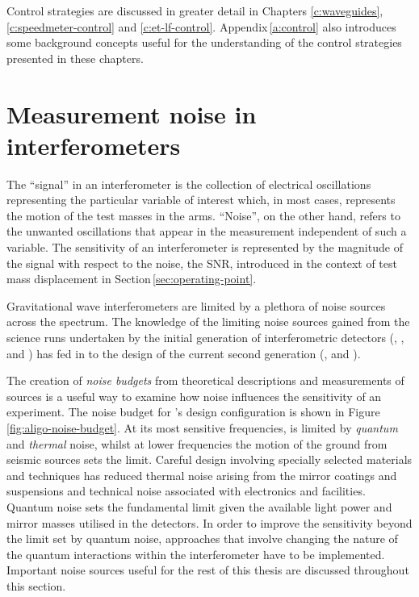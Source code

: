 Control strategies are discussed in greater detail in Chapters \ref{c:waveguides}, \ref{c:speedmeter-control} and \ref{c:et-lf-control}. Appendix\,\ref{a:control} also introduces some background concepts useful for the understanding of the control strategies presented in these chapters.

\section{\label{sec:ifo-noise}Measurement noise in interferometers}
The ``signal'' in an interferometer is the collection of electrical oscillations representing the particular variable of interest which, in most cases, represents the motion of the test masses in the arms. ``Noise'', on the other hand, refers to the unwanted oscillations that appear in the measurement independent of such a variable. The sensitivity of an interferometer is represented by the magnitude of the signal with respect to the noise, the \gls{SNR}, introduced in the context of test mass displacement in Section\,\ref{sec:operating-point}.

Gravitational wave interferometers are limited by a plethora of noise sources across the spectrum. The knowledge of the limiting noise sources gained from the science runs undertaken by the initial generation of interferometric detectors (\LIGO{}, \VIRGO{}, \GEO{} and \TAMA{}) has fed in to the design of the current second generation (\ALIGO{}, \AVIRGO{} and \KAGRA{}).

The creation of \emph{noise budgets} from theoretical descriptions and measurements of sources is a useful way to examine how noise influences the sensitivity of an experiment. The noise budget for \ALIGO{}'s design configuration is shown in Figure\,\ref{fig:aligo-noise-budget}. At its most sensitive frequencies, \ALIGO{} is limited by \emph{quantum} and \emph{thermal} noise, whilst at lower frequencies the motion of the ground from seismic sources sets the limit. Careful design involving specially selected materials and techniques has reduced thermal noise arising from the mirror coatings and suspensions and technical noise associated with electronics and facilities. Quantum noise sets the fundamental limit given the available light power and mirror masses utilised in the detectors. In order to improve the sensitivity beyond the limit set by quantum noise, approaches that involve changing the nature of the quantum interactions within the interferometer have to be implemented. Important noise sources useful for the rest of this thesis are discussed throughout this section.

